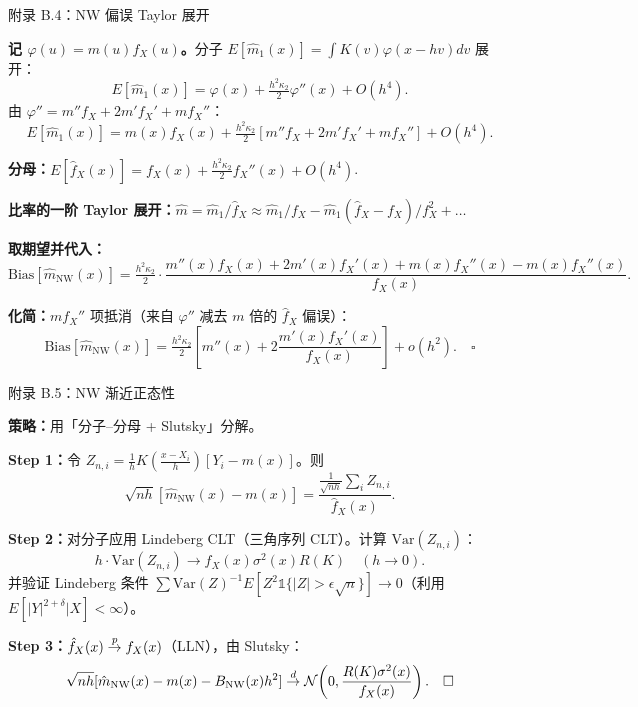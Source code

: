 \documentclass[aspectratio=169, 10pt]{beamer}
\begin{document}
\begin{frame}{附录 B.4：NW 偏误 Taylor 展开}
  \hypertarget{proof-b4}{}

  \textbf{记 $\varphi(u) = m(u) f_X(u)$。}分子
  $E[\hat m_1(x)] = \int K(v) \varphi(x - hv) dv$ 展开：
  \[
    E[\hat m_1(x)] = \varphi(x) + \tfrac{h^2\kappa_2}{2}\varphi''(x) + O(h^4).
  \]
  由 $\varphi'' = m'' f_X + 2 m' f_X' + m f_X''$：
  \[
    E[\hat m_1(x)] = m(x) f_X(x) + \tfrac{h^2\kappa_2}{2}[m'' f_X + 2 m' f_X' + m f_X''] + O(h^4).
  \]

  \textbf{分母：}$E[\hat f_X(x)] = f_X(x) + \tfrac{h^2\kappa_2}{2}f_X''(x) + O(h^4)$.

  \textbf{比率的一阶 Taylor 展开：}$\hat m = \hat m_1/\hat f_X \approx \hat m_1/f_X - \hat m_1 (\hat f_X - f_X)/f_X^2 + \ldots$

  \textbf{取期望并代入：}
  \[
    \text{Bias}[\hat m_{\text{NW}}(x)] = \tfrac{h^2\kappa_2}{2}\cdot\frac{m''(x) f_X(x) + 2 m'(x) f_X'(x) + m(x) f_X''(x) - m(x) f_X''(x)}{f_X(x)}.
  \]

  \textbf{化简：}$m f_X''$ 项抵消（来自 $\varphi''$ 减去 $m$ 倍的 $\hat f_X$ 偏误）：
  \[
    \text{Bias}[\hat m_{\text{NW}}(x)] = \tfrac{h^2\kappa_2}{2}\left[m''(x) + 2\frac{m'(x) f_X'(x)}{f_X(x)}\right] + o(h^2).\quad\square
  \]

  \hfill{\scriptsize\hyperlink{main-b4}{}}
\end{frame}


\begin{frame}{附录 B.5：NW 渐近正态性}
  \hypertarget{proof-b5}{}

  \textbf{策略：}用「分子--分母 + Slutsky」分解。

  \textbf{Step 1：}令 $Z_{n,i} = \frac{1}{h}K\!\left(\frac{x-X_i}{h}\right)[Y_i - m(x)]$。则
  \[
    \sqrt{nh}[\hat m_{\text{NW}}(x) - m(x)] = \frac{\frac{1}{\sqrt{nh}}\sum_i Z_{n,i}}{\hat f_X(x)}.
  \]

  \textbf{Step 2：}对分子应用 Lindeberg CLT（三角序列 CLT）。计算 $\text{Var}(Z_{n,i})$：
  \[
    h\cdot \text{Var}(Z_{n,i}) \to f_X(x) \sigma^2(x) R(K) \quad (h\to 0).
  \]
  并验证 Lindeberg 条件 $\sum \text{Var}(Z)^{-1} E[Z^2 \mathds{1}\{|Z|>\epsilon\sqrt{n}\}] \to 0$（利用 $E[|Y|^{2+\delta}|X]<\infty$）。

  \textbf{Step 3：}$\hat f_X(x) \overset{p}{\to} f_X(x)$（LLN），由 Slutsky：
  \[
    \sqrt{nh}[\hat m_{\text{NW}}(x) - m(x) - B_{\text{NW}}(x) h^2]
    \overset{d}{\to} \mathcal{N}\!\left(0, \frac{R(K)\sigma^2(x)}{f_X(x)}\right).\quad\square
  \]

  \hfill{\scriptsize\hyperlink{main-b5}{}}
\end{frame}
\end{document}
